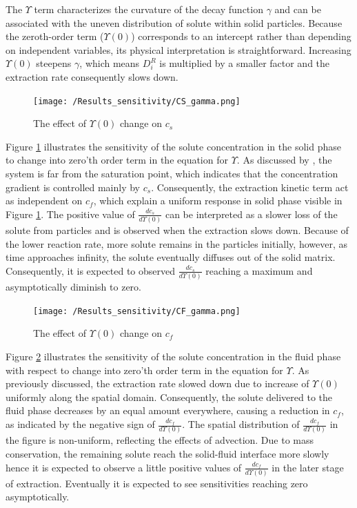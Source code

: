 \documentclass[a4paper,fleqn]{cas-dc}
\begin{document}
	{\color{blue}The $\Upsilon$ term characterizes the curvature of the decay function $\gamma$ and can be associated with the uneven distribution of solute within solid particles. Because the zeroth-order term ($\Upsilon(0)$) corresponds to an intercept rather than depending on independent variables, its physical interpretation is straightforward. Increasing $\Upsilon(0)$ steepens $\gamma$, which means $D_i^R$ is multiplied by a smaller factor and the extraction rate consequently slows down.
	
	\begin{figure}[!ht]
		\centering
		\texttt{[image: /Results\_sensitivity/CS\_gamma.png]}
		\caption{The effect of $\Upsilon(0)$ change on $c_s$}
		\label{fig:Sensitivty_Gamma_CS}
	\end{figure}
	
	Figure \ref{fig:Sensitivty_Gamma_CS} illustrates the sensitivity of the solute concentration in the solid phase to change into zero'th order term in the equation for $\Upsilon$. As discussed by \citet{Sliczniuk2024}, the system is far from the saturation point, which indicates that the concentration gradient is controlled mainly by $c_s$. Consequently, the extraction kinetic term act as independent on $c_f$, which explain a uniform response in solid phase visible in Figure \ref{fig:Sensitivty_Gamma_CS}. The positive value of $\frac{dc_s}{d\Upsilon(0)}$ can be interpreted as a slower loss of the solute from particles and is observed when the extraction slows down. Because of the lower reaction rate, more solute remains in the particles initially, however, as time approaches infinity, the solute eventually diffuses out of the solid matrix. Consequently, it is expected to observed $\frac{dc_s}{d\Upsilon(0)}$ reaching a maximum and asymptotically diminish to zero.
	
	\begin{figure}[!ht]
		\centering
		\texttt{[image: /Results\_sensitivity/CF\_gamma.png]}
		\caption{The effect of $\Upsilon(0)$ change on $c_f$}
		\label{fig:Sensitivty_Gamma_CF}
	\end{figure}
	
	Figure \ref{fig:Sensitivty_Gamma_CF} illustrates the sensitivity of the solute concentration in the fluid phase with respect to change into zero'th order term in the equation for $\Upsilon$. As previously discussed, the extraction rate slowed down due to increase of $\Upsilon(0)$ uniformly along the spatial domain. 
	Consequently, the solute delivered to the fluid phase decreases by an equal amount everywhere, causing a reduction in $c_f$, as indicated by the negative sign of  $\frac{dc_f}{d\Upsilon(0)}$. The spatial distribution of $\frac{dc_f}{d\Upsilon(0)}$ in the figure is non-uniform, reflecting the effects of advection. Due to mass conservation, the remaining solute reach the solid-fluid interface  more slowly hence it is expected to observe a little positive values of $\frac{dc_f}{d\Upsilon(0)}$ in the later stage of extraction. Eventually it is expected to see sensitivities reaching zero asymptotically.
	
}
\end{document}

